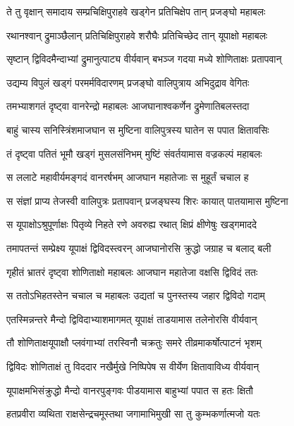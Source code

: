 \twolineshloka
{ते तु वृक्षान् समादाय सम्प्रचिक्षिपुराहवे}
{खड्गेन प्रतिचिक्षेप तान् प्रजङ्घो महाबलः} %

\twolineshloka
{रथानश्वान् द्रुमाञ्छैलान् प्रतिचिक्षिपुराहवे}
{शरौघैः प्रतिचिच्छेद तान् यूपाक्षो महाबलः} %

\twolineshloka
{सृष्टान् द्विविदमैन्दाभ्यां द्रुमानुत्पाट्य वीर्यवान्}
{बभञ्ज गदया मध्ये शोणिताक्षः प्रतापवान्} %

\twolineshloka
{उद्यम्य विपुलं खड्गं परमर्मविदारणम्}
{प्रजङ्घो वालिपुत्राय अभिदुद्राव वेगितः} %

\twolineshloka
{तमभ्याशगतं दृष्ट्वा वानरेन्द्रो महाबलः}
{आजघानाश्वकर्णेन द्रुमेणातिबलस्तदा} %

\twolineshloka
{बाहुं चास्य सनिस्त्रिंशमाजघान स मुष्टिना}
{वालिपुत्रस्य घातेन स पपात क्षितावसिः} %

\twolineshloka
{तं दृष्ट्वा पतितं भूमौ खड्गं मुसलसंनिभम्}
{मुष्टिं संवर्तयामास वज्रकल्पं महाबलः} %

\twolineshloka
{स ललाटे महावीर्यमङ्गदं वानरर्षभम्}
{आजघान महातेजाः स मुहूर्तं चचाल ह} %

\twolineshloka
{स संज्ञां प्राप्य तेजस्वी वालिपुत्रः प्रतापवान्}
{प्रजङ्घस्य शिरः कायात् पातयामास मुष्टिना} %

\twolineshloka
{स यूपाक्षोऽश्रुपूर्णाक्षः पितृव्ये निहते रणे}
{अवरुह्य रथात् क्षिप्रं क्षीणेषुः खड्गमाददे} %

\twolineshloka
{तमापतन्तं सम्प्रेक्ष्य यूपाक्षं द्विविदस्त्वरन्}
{आजघानोरसि क्रुद्धो जग्राह च बलाद् बली} %

\twolineshloka
{गृहीतं भ्रातरं दृष्ट्वा शोणिताक्षो महाबलः}
{आजघान महातेजा वक्षसि द्विविदं ततः} %

\twolineshloka
{स ततोऽभिहतस्तेन चचाल च महाबलः}
{उद्यतां च पुनस्तस्य जहार द्विविदो गदाम्} %

\twolineshloka
{एतस्मिन्नन्तरे मैन्दो द्विविदाभ्याशमागमत्}
{यूपाक्षं ताडयामास तलेनोरसि वीर्यवान्} %

\twolineshloka
{तौ शोणिताक्षयूपाक्षौ प्लवंगाभ्यां तरस्विनौ}
{चक्रतुः समरे तीव्रमाकर्षोत्पाटनं भृशम्} %

\twolineshloka
{द्विविदः शोणिताक्षं तु विददार नखैर्मुखे}
{निष्पिपेष स वीर्येण क्षितावाविध्य वीर्यवान्} %

\twolineshloka
{यूपाक्षमभिसंक्रुद्धो मैन्दो वानरपुङ्गवः}
{पीडयामास बाहुभ्यां पपात स हतः क्षितौ} %

\twolineshloka
{हतप्रवीरा व्यथिता राक्षसेन्द्रचमूस्तथा}
{जगामाभिमुखी सा तु कुम्भकर्णात्मजो यतः} %


